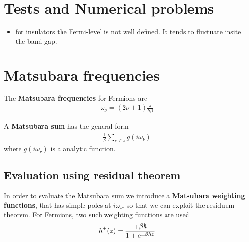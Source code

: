 \documentclass[11pt,a4paper]{report}
\begin{document}
\chapter{Tests and Numerical problems}
\begin{itemize}
\item for insulators the Fermi-level is not well defined. It tends to
  fluctuate insite the band gap.
\end{itemize}



\appendix
\chapter{Matsubara frequencies}
\label{app:matsubarafreq}

The \textbf{Matsubara frequencies} for Fermions are
\begin{eqnarray*}
\omega_\nu=(2\nu+1)\frac{\pi}{\hbar\beta}
\end{eqnarray*}

A \textbf{Matsubara sum}
 has the general form
\begin{eqnarray*}
\frac{1}{\beta}\sum_{\nu\in z} g(i\omega_\nu)
\end{eqnarray*}
where $g(i\omega_\nu)$ is a analytic function.

\section{Evaluation using residual theorem}
In order to evaluate the Matsubara sum we introduce a
\textbf{Matsubara weighting functions}, that has simple poles at $i\omega_\nu$, so that we can
exploit the residuum theorem. For Fermions, two such weighting
functions are used
\begin{eqnarray}
h^\pm(z)=\frac{\mp\beta\hbar}{1+\mathrm{e}^{\pm\beta\hbar z}}
\end{eqnarray}
\end{document}
